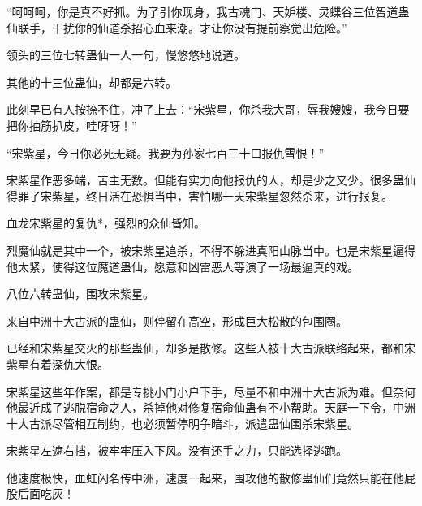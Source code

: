 \begin{this_body}
“呵呵呵，你是真不好抓。为了引你现身，我古魂门、天妒楼、灵蝶谷三位智道蛊仙联手，干扰你的仙道杀招心血来潮。才让你没有提前察觉出危险。”

领头的三位七转蛊仙一人一句，慢悠悠地说道。

其他的十三位蛊仙，却都是六转。

此刻早已有人按捺不住，冲了上去：“宋紫星，你杀我大哥，辱我嫂嫂，我今日要把你抽筋扒皮，哇呀呀！”

“宋紫星，今日你必死无疑。我要为孙家七百三十口报仇雪恨！”

宋紫星作恶多端，苦主无数。但能有实力向他报仇的人，却是少之又少。很多蛊仙得罪了宋紫星，终日活在恐惧当中，害怕哪一天宋紫星忽然杀来，进行报复。

血龙宋紫星的复仇*，强烈的众仙皆知。

烈魔仙就是其中一个，被宋紫星追杀，不得不躲进真阳山脉当中。也是宋紫星逼得他太紧，使得这位魔道蛊仙，愿意和凶雷恶人等演了一场最逼真的戏。

八位六转蛊仙，围攻宋紫星。

来自中洲十大古派的蛊仙，则停留在高空，形成巨大松散的包围圈。

已经和宋紫星交火的那些蛊仙，却多是散修。这些人被十大古派联络起来，都和宋紫星有着深仇大恨。

宋紫星这些年作案，都是专挑小门小户下手，尽量不和中洲十大古派为难。但奈何他最近成了逃脱宿命之人，杀掉他对修复宿命仙蛊有不小帮助。天庭一下令，中洲十大古派尽管相互制约，也必须暂停明争暗斗，派遣蛊仙围杀宋紫星。

宋紫星左遮右挡，被牢牢压入下风。没有还手之力，只能选择逃跑。

他速度极快，血虹闪名传中洲，速度一起来，围攻他的散修蛊仙们竟然只能在他屁股后面吃灰！

\end{this_body}

